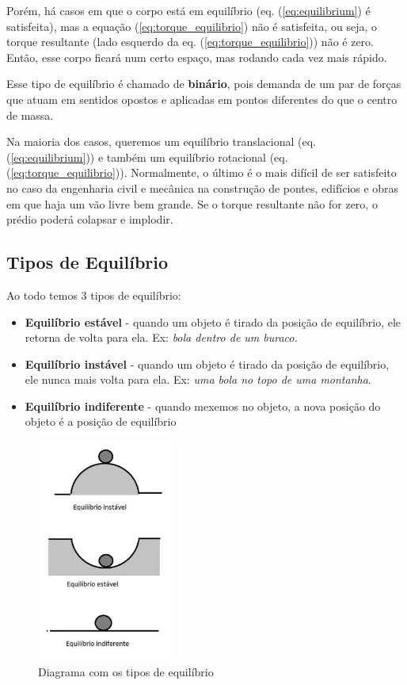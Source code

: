 \documentclass[12pt]{extarticle}
\newcommand{\<}{\langle}
\renewcommand{\>}{\rangle}
\theoremstyle{definition}
\begin{document}
Porém, há casos em que o corpo está em equilíbrio (eq. (\ref{eq:equilibrium}) é satisfeita), mas a equação (\ref{eq:torque_equilibrio}) não é satisfeita, ou seja, o torque resultante (lado esquerdo da eq. (\ref{eq:torque_equilibrio})) não é zero. Então, esse corpo ficará num certo espaço, mas rodando cada vez mais rápido.

Esse tipo de equilíbrio é chamado de \textbf{binário}, pois demanda de um par de forças que atuam em sentidos opostos e aplicadas em pontos diferentes do que o centro de massa. 

Na maioria dos casos, queremos um equilíbrio translacional (eq. (\ref{eq:equilibrium})) e também um equilíbrio rotacional (eq. (\ref{eq:torque_equilibrio})). Normalmente, o último é o mais difícil de ser satisfeito no caso da engenharia civil e mecânica na construção de pontes, edifícios e obras em que haja um vão livre bem grande. Se o torque resultante não for zero, o prédio poderá colapsar e implodir.

\subsection{Tipos de Equilíbrio}
Ao todo temos 3 tipos de equilíbrio:
\begin{itemize}
    \item \textbf{Equilíbrio estável} - quando um objeto é tirado da posição de equilíbrio, ele retorna de volta para ela. Ex: \textit{bola dentro de um buraco.}
    \item \textbf{Equilíbrio instável} - quando um objeto é tirado da posição de equilíbrio, ele nunca mais volta para ela. Ex: \textit{uma bola no topo de uma montanha}.
    \item \textbf{Equilíbrio indiferente} - quando mexemos no objeto, a nova posição do objeto é a posição de equilíbrio
\end{itemize}

\begin{figure}[H]
    \centering
    \includegraphics[width=0.4\textwidth]{tipos-de-equilibrio_300x491.jpg}
    \caption{Diagrama com os tipos de equilíbrio}
    \label{fig:tipos_de_equilibrio}
\end{figure}
\end{document}
